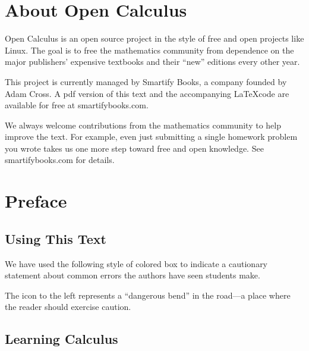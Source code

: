 \documentclass[11pt]{book}
\newcounter{error}[chapter]
\numberwithin{example}{chapter}
\begin{document}
\chapter*{About Open Calculus}

Open Calculus is an open source project in the style of free and open projects like Linux.  The goal is to free the mathematics community from dependence on the major publishers' expensive textbooks and their ``new'' editions every other year.  

This project is currently managed by Smartify Books, a company founded by Adam Cross.  A pdf version of this text and the accompanying \LaTeX code are available for free at smartifybooks.com.  

We always welcome contributions from the mathematics community to help improve the text.  For example, even just submitting a single homework problem you wrote takes us one more step toward free and open knowledge.  See smartifybooks.com for details.  



\tableofcontents                        %










\mainmatter                             %


\chapter*{Preface}

\section{Using This Text}


We have used the following style of colored box to indicate a cautionary statement about common errors the authors have seen students make.  

\begin{error}
The icon to the left represents a ``dangerous bend'' in the road---a place where the reader should exercise caution.
\end{error}


\section*{Learning Calculus}
\end{document}
